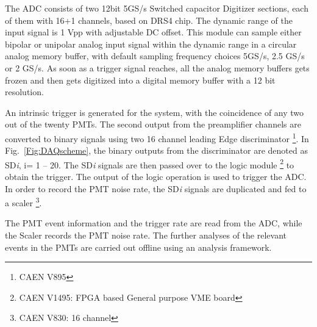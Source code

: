 

The ADC consists of two 12bit 5GS/s Switched capacitor Digitizer sections, 
each of them with 16+1 channels, based on DRS4 chip. The dynamic range of the input signal is 1 
Vpp with adjustable DC offset. This module can sample either bipolar or unipolar analog input 
signal within the dynamic range in a circular 
analog memory buffer, with default sampling frequency choices 5GS/s, 2.5 GS/s 
or 2 GS/s. As soon as a trigger signal reaches, all the analog memory 
buffers gets frozen and then gets digitized into a digital memory buffer 
with a 12 bit resolution. 

An intrinsic trigger is generated for the system, 
with the coincidence of any two out of the twenty PMTs. The second output from the 
preamplifier channels are converted to binary signals using two 16 channel leading 
Edge discriminator \footnote{CAEN V895}. In Fig.~\ref{Fig:DAQscheme}, the binary 
outputs from the discriminator are denoted as SD{\it i}, i= 1 -- 20. The SD{\it i} signals are then passed over to 
the logic module \footnote{CAEN V1495: FPGA based General purpose VME board} to obtain the trigger. The output of the logic operation is 
used to trigger the ADC. In order to record the PMT noise rate, the 
SD{\it i} signals are duplicated and fed to a scaler \footnote{CAEN V830: 16 channel}.

The PMT event information and the trigger rate are read from the ADC, while the Scaler 
records the PMT noise rate. The further analyses of the 
relevant events in the PMTs are carried out offline using an analysis 
framework.










